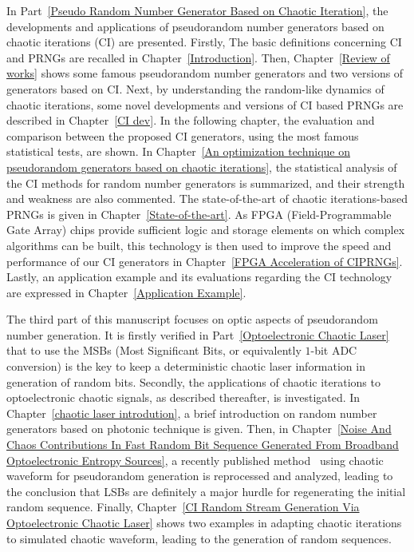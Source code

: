 In Part~\ref{Pseudo Random Number Generator Based on Chaotic Iteration}, the developments and applications of pseudorandom number generators based on chaotic iterations (CI) are presented. Firstly, The basic definitions concerning CI and PRNGs are recalled in Chapter~\ref{Introduction}. Then, Chapter~\ref{Review of works} shows some famous pseudorandom number generators and two versions of generators based on CI. Next, by understanding the random-like dynamics of chaotic iterations, some novel developments and versions of CI based PRNGs are described in Chapter~\ref{CI dev}. In the following chapter, %
 the evaluation and comparison between the proposed CI generators, using the most famous statistical tests, are shown. 
In Chapter~\ref{An optimization technique on pseudorandom generators based on chaotic iterations}, the statistical analysis of the CI methods for random number generators is summarized, and their strength and weakness are also commented. 
The state-of-the-art of chaotic iterations-based PRNGs is given in Chapter~\ref{State-of-the-art}.
As FPGA (Field-Programmable Gate Array) chips provide sufficient logic and storage elements on which complex algorithms can be built, this technology is then used to improve the speed and performance of our CI generators in Chapter~\ref{FPGA Acceleration of CIPRNGs}. Lastly, 
an application example and its evaluations regarding the CI technology are expressed in Chapter~\ref{Application Example}.

The third part of this manuscript focuses on optic aspects of pseudorandom number generation. It is firstly verified in Part~\ref{Optoelectronic Chaotic Laser} that to use the MSBs (Most Significant Bits, or equivalently $1$-bit ADC conversion) is the key to keep a deterministic chaotic laser information in generation of random bits. Secondly, the applications of chaotic iterations to optoelectronic chaotic signals, as described
thereafter, is investigated. In Chapter~\ref{chaotic laser introdution}, a brief introduction on random number generators based on photonic technique is given. Then, in Chapter~\ref{Noise And Chaos Contributions In Fast Random Bit Sequence Generated From Broadband Optoelectronic Entropy Sources}, a recently published method~\cite{ultrafast2009, ultrafast2010} using chaotic waveform for pseudorandom generation is reprocessed and analyzed, leading to the conclusion that LSBs are definitely a major hurdle for regenerating the initial random sequence. Finally, Chapter~\ref{CI Random Stream Generation Via Optoelectronic Chaotic Laser} shows two examples in adapting chaotic iterations to simulated chaotic waveform, leading to the generation of random sequences.

